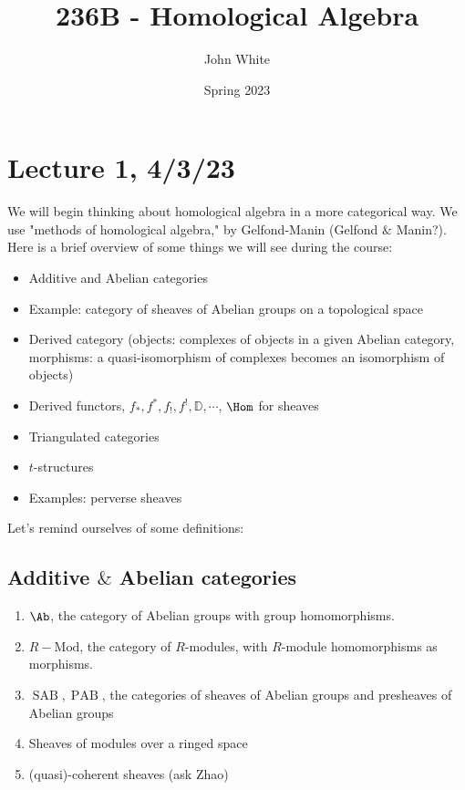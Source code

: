\documentclass[x11names,reqno,14pt]{extarticle}
\title{236B - Homological Algebra}
\author{John White}
\date{Spring 2023}
\newcommand{\RMod}{R-\text{Mod}}
\newcommand{\D}{\mathbb{D}}
\DeclareMathOperator{\SAB}{SAB}
\DeclareMathOperator{\PAB}{PAB}
\begin{document}
\section*{Lecture 1, 4/3/23}

We will begin thinking about homological algebra in a more categorical way. We use "methods of homological algebra," by Gelfond-Manin (Gelfond $\&$ Manin?). Here is a brief overview of some things we will see during the course:

\begin{itemize}

\item Additive and Abelian categories

\item Example: category of sheaves of Abelian groups on a topological space

\item Derived category (objects: complexes of objects in a given Abelian category, morphisms: a quasi-isomorphism of complexes becomes an isomorphism of objects)

\item Derived functors, $f_*, f^*, f_{!}, f^{!}, \D, \cdots$, $\Hom$ for sheaves

\item Triangulated categories

\item $t$-structures

\item Examples: perverse sheaves


\end{itemize} 


Let's remind ourselves of some definitions:

\subsection*{Additive $\&$ Abelian categories}

\exm

\begin{enumerate}[label=(\alph*)]

\item $\Ab$, the category of Abelian groups with group homomorphisms.

\item $\RMod$, the category of $R$-modules, with $R$-module homomorphisms as morphisms.

\item $\SAB, \PAB$, the categories of sheaves of Abelian groups and presheaves of Abelian groups

\item Sheaves of modules over a ringed space 

\item (quasi)-coherent sheaves (ask Zhao)

\end{enumerate}
\end{document}
